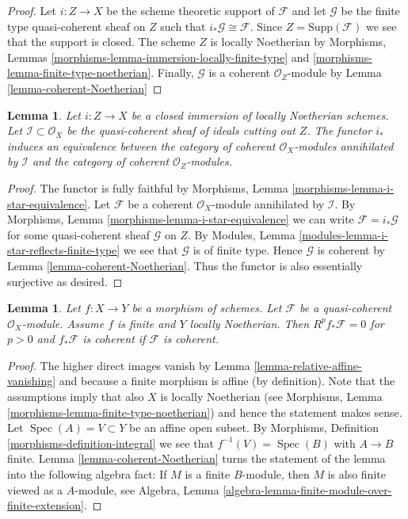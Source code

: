 \documentclass{stacks-project}
\theoremstyle{plain}
\newtheorem{lemma}[subsection]{Lemma}
\theoremstyle{definition}
\theoremstyle{remark}
\numberwithin{equation}{subsection}
\def\Spec{\mathop{\mathrm{Spec}}}
\begin{document}
\begin{proof}
Let $i : Z \to X$ be the scheme theoretic support of $\mathcal{F}$ and
let $\mathcal{G}$ be the finite type quasi-coherent sheaf on $Z$
such that $i_*\mathcal{G} \cong \mathcal{F}$.
Since $Z = \text{Supp}(\mathcal{F})$ we see that the support is closed.
The scheme $Z$ is locally Noetherian by
Morphisms, Lemmas \ref{morphisms-lemma-immersion-locally-finite-type}
and \ref{morphisms-lemma-finite-type-noetherian}.
Finally, $\mathcal{G}$ is a coherent $\mathcal{O}_Z$-module by
Lemma \ref{lemma-coherent-Noetherian}
\end{proof}

\begin{lemma}
\label{lemma-i-star-equivalence}
Let $i : Z \to X$ be a closed immersion of locally Noetherian schemes.
Let $\mathcal{I} \subset \mathcal{O}_X$ be the quasi-coherent sheaf of ideals
cutting out $Z$. The functor $i_*$ induces an equivalence between the
category of coherent $\mathcal{O}_X$-modules annihilated by $\mathcal{I}$
and the category of coherent $\mathcal{O}_Z$-modules.
\end{lemma}

\begin{proof}
The functor is fully faithful by
Morphisms, Lemma \ref{morphisms-lemma-i-star-equivalence}.
Let $\mathcal{F}$ be a coherent $\mathcal{O}_X$-module
annihilated by $\mathcal{I}$. By
Morphisms, Lemma \ref{morphisms-lemma-i-star-equivalence}
we can write $\mathcal{F} = i_*\mathcal{G}$ for some quasi-coherent
sheaf $\mathcal{G}$ on $Z$. By
Modules, Lemma \ref{modules-lemma-i-star-reflects-finite-type}
we see that $\mathcal{G}$ is of finite type.
Hence $\mathcal{G}$ is coherent by
Lemma \ref{lemma-coherent-Noetherian}.
Thus the functor is also essentially surjective as desired.
\end{proof}

\begin{lemma}
\label{lemma-finite-pushforward-coherent}
Let $f : X \to Y$ be a morphism of schemes.
Let $\mathcal{F}$ be a quasi-coherent $\mathcal{O}_X$-module.
Assume $f$ is finite and $Y$ locally Noetherian.
Then $R^pf_*\mathcal{F} = 0$ for $p > 0$ and
$f_*\mathcal{F}$ is coherent if $\mathcal{F}$ is coherent.
\end{lemma}

\begin{proof}
The higher direct images vanish by
Lemma \ref{lemma-relative-affine-vanishing} and because
a finite morphism is affine (by definition).
Note that the assumptions imply that also $X$ is locally Noetherian
(see Morphisms, Lemma \ref{morphisms-lemma-finite-type-noetherian})
and hence the statement makes sense.
Let $\Spec(A) = V \subset Y$ be an affine open subset.
By Morphisms, Definition \ref{morphisms-definition-integral}
we see that $f^{-1}(V) = \Spec(B)$ with $A \to B$ finite.
Lemma \ref{lemma-coherent-Noetherian}
turns the statement of the lemma into the following algebra
fact: If $M$ is a finite $B$-module, then $M$ is also finite
viewed as a $A$-module, see
Algebra, Lemma \ref{algebra-lemma-finite-module-over-finite-extension}.
\end{proof}
\end{document}
